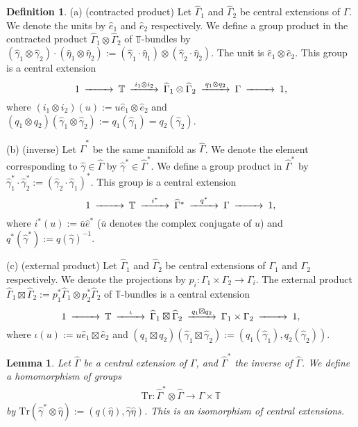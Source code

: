 \documentclass[a4paper,a4paper]{article}
\newtheorem{lem}[thm]{Lemma}
\theoremstyle{definition}
\newtheorem{dfn}[thm]{Definition}
\theoremstyle{remark}
\newcommand{\T}{\mathbb{T}}
\newcommand{\Tr}{\mathrm{Tr}}
\def\h#1{ \widehat{#1} }
\begin{document}
\begin{dfn} \label{dfn_operations_ce}
(a) (contracted product) Let $\h{\Gamma}_1$ and $\h{\Gamma}_2$ be central extensions of $\Gamma$. We denote the units by $\hat{e}_1$ and $\hat{e}_2$ respectively. We define a group product in the contracted product $\h{\Gamma}_1 \otimes \h{\Gamma}_2$ of $\T$-bundles by $(\h{\gamma}_1 \otimes \h{\gamma}_2) \cdot (\h{\eta}_1 \otimes \h{\eta}_2) := (\h{\gamma}_1 \cdot \h{\eta}_1) \otimes (\h{\gamma}_2 \cdot \h{\eta}_2)$. The unit is $\hat{e}_1 \otimes \hat{e}_2$. This group is a central extension
$$
\begin{CD}
1 @>>> \T @>i_1 \otimes i_2>> 
\h{\Gamma}_1 \otimes \h{\Gamma}_2 @>q_1 \otimes q_2>>  \Gamma @>>> 1, 
\end{CD}
$$
where $(i_1 \otimes i_2)(u) := u \h{e}_1 \otimes \h{e}_2$ and $(q_1 \otimes q_2)(\h{\gamma}_1 \otimes \h{\gamma}_2) := q_1(\h{\gamma}_1) = q_2(\h{\gamma}_2)$.

(b) (inverse) Let $\h{\Gamma}^*$ be the same manifold as $\h{\Gamma}$. We denote the element corresponding to $\h{\gamma} \in \h{\Gamma}$ by $\h{\gamma}^* \in \h{\Gamma}^*$. We define a group product in $\h{\Gamma}^*$ by $\h{\gamma}^*_1 \cdot \h{\gamma}^*_2 := ( \h{\gamma}_2 \cdot \h{\gamma}_1 )^*$. This group is a central extension
$$
\begin{CD}
1 @>>> \T @>i^*>> \h{\Gamma}^* @>q^*>> \Gamma @>>> 1,
\end{CD}
$$
where $i^*(u) := \overline{u} \h{e}^*$ ($\overline{u}$ denotes the complex conjugate of $u$) and $q^*(\h{\gamma}^*) := q(\h{\gamma})^{-1}$.

(c) (external product)
Let $\h{\Gamma}_1$ and $\h{\Gamma}_2$ be central extensions of $\Gamma_1$ and $\Gamma_2$ respectively. We denote the projections by $p_i : \Gamma_1 \times \Gamma_2 \to \Gamma_i$. The external product $\h{\Gamma}_1 \boxtimes \h{\Gamma}_2 := p_1^* \h{\Gamma}_1 \otimes p_2^* \h{\Gamma}_2$ of $\T$-bundles is a central extension
$$
\begin{CD}
1 @>>> \T @>\iota>> \h{\Gamma}_1 \boxtimes \h{\Gamma}_2 
@>q_1 \boxtimes q_2>> \Gamma_1 \times \Gamma_2 @>>> 1 ,
\end{CD}
$$
where $\iota(u) := u \h{e}_1 \boxtimes \h{e}_2$ and $(q_1 \boxtimes q_2) (\h{\gamma}_1 \boxtimes \h{\gamma}_2) := (q_1(\h{\gamma}_1), q_2(\h{\gamma}_2))$.
\end{dfn}

\begin{lem} \label{lem_tr_ce}
Let $\h{\Gamma}$ be a central extension of $\Gamma$, and $\h{\Gamma}^*$ the inverse of $\h{\Gamma}$. We define a homomorphism of groups
\begin{eqnarray*}
\Tr : \h{\Gamma}^* \otimes \h{\Gamma} \rightarrow \Gamma \times \T
\end{eqnarray*}
by $\Tr(\h{\gamma}^* \otimes \h{\eta}) := (q(\h{\eta}), \h{\gamma} \h{\eta})$. This is an isomorphism of central extensions.
\end{lem}
\end{document}
